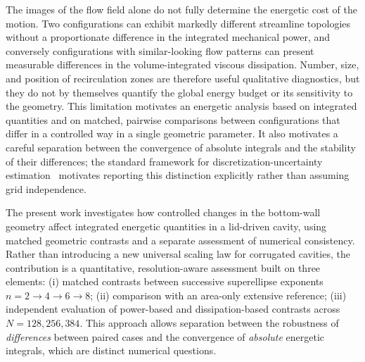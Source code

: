 The images of the flow field alone do not fully determine the energetic cost of the motion. Two configurations can exhibit markedly different streamline topologies without a proportionate difference in the integrated mechanical power, and conversely configurations with similar-looking flow patterns can present measurable differences in the volume-integrated viscous dissipation. Number, size, and position of recirculation zones are therefore useful qualitative diagnostics, but they do not by themselves quantify the global energy budget or its sensitivity to the geometry. This limitation motivates an energetic analysis based on integrated quantities and on matched, pairwise comparisons between configurations that differ in a controlled way in a single geometric parameter. It also motivates a careful separation between the convergence of absolute integrals and the stability of their differences; the standard framework for discretization-uncertainty estimation~\cite{Celik2008} motivates reporting this distinction explicitly rather than assuming grid independence.

The present work investigates how controlled changes in the bottom-wall geometry affect integrated energetic quantities in a lid-driven cavity, using matched geometric contrasts and a separate assessment of numerical consistency. Rather than introducing a new universal scaling law for corrugated cavities, the contribution is a quantitative, resolution-aware assessment built on three elements: (i) matched contrasts between successive superellipse exponents $n=2\rightarrow4\rightarrow6\rightarrow8$; (ii) comparison with an area-only extensive reference; (iii) independent evaluation of power-based and dissipation-based contrasts across $N=128,256,384$. This approach allows separation between the robustness of \emph{differences} between paired cases and the convergence of \emph{absolute} energetic integrals, which are distinct numerical questions.

